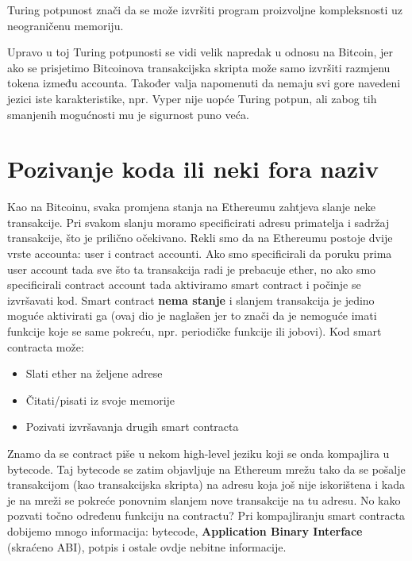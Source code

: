 \documentclass[12pt]{report}
\begin{document}
\begin{napomena}
Turing potpunost znači da se može izvršiti program proizvoljne kompleksnosti uz neograničenu memoriju.
\end{napomena}

Upravo u toj Turing potpunosti se vidi velik napredak u odnosu na Bitcoin, jer ako se prisjetimo Bitcoinova transakcijska skripta može samo izvršiti razmjenu tokena između accounta. Također valja napomenuti da nemaju svi gore navedeni jezici iste karakteristike, npr. Vyper nije uopće Turing potpun, ali zabog tih smanjenih mogućnosti mu je sigurnost puno veća.

\section{Pozivanje koda ili neki fora naziv}

Kao na Bitcoinu, svaka promjena stanja na Ethereumu zahtjeva slanje neke transakcije. Pri svakom slanju moramo specificirati adresu primatelja i sadržaj transakcije, što je prilično očekivano. Rekli smo da na Ethereumu postoje dvije vrste accounta: user i contract accounti. Ako smo specificirali da poruku prima user account tada sve što ta transakcija radi je prebacuje ether, no ako smo specificirali contract account tada aktiviramo smart contract i počinje se izvršavati kod. Smart contract \textbf{nema stanje} i slanjem transakcija je jedino moguće aktivirati ga (ovaj dio je naglašen jer to znači da je nemoguće imati funkcije koje se same pokreću, npr. periodičke funkcije ili jobovi). Kod smart contracta može:

\begin{itemize}
    \item Slati ether na željene adrese
    \item Čitati/pisati iz svoje memorije
    \item Pozivati izvršavanja drugih smart contracta
\end{itemize}

Znamo da se contract piše u nekom high-level jeziku koji se onda kompajlira u bytecode. Taj bytecode se zatim objavljuje na Ethereum mrežu tako da se pošalje transakcijom (kao transakcijska skripta) na adresu koja još nije iskorištena i kada je na mreži se pokreće ponovnim slanjem nove transakcije na tu adresu. No kako pozvati točno određenu funkciju na contractu? Pri kompajliranju smart contracta dobijemo mnogo informacija: bytecode,  \textbf{Application Binary Interface} (skraćeno ABI), potpis i ostale ovdje nebitne informacije.
\end{document}
